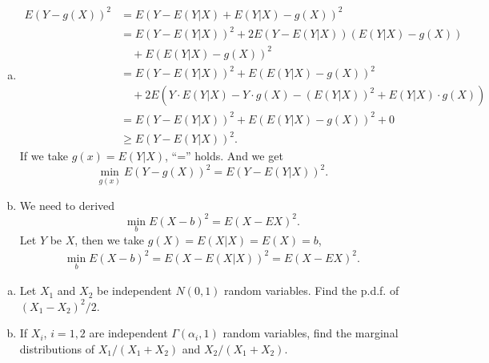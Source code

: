 \documentclass[14pt]{elegantbook}
\begin{document}
    \begin{solution}
        \begin{enumerate}[(a)]
            \item \begin{align*}
                E(Y-g(X))^2&=E(Y-E(Y|X)+E(Y|X)-g(X))^2\\
                &=E(Y-E(Y|X))^2+2E(Y-E(Y|X))(E(Y|X)-g(X))\\
                &\quad+E(E(Y|X)-g(X))^2\\
                &=E(Y-E(Y|X))^2+E(E(Y|X)-g(X))^2\\
                &\quad+2E(Y\cdot E(Y|X)-Y\cdot g(X)-(E(Y|X))^2+E(Y|X)\cdot g(X))\\
                &=E(Y-E(Y|X))^2+E(E(Y|X)-g(X))^2+0\\
                &\geq E(Y-E(Y|X))^2. 
            \end{align*}
            If we take $g(x)=E(Y|X)$, ``='' holds. And we get 
            \[
                \min_{g(x)} E(Y-g(X))^2=E(Y-E(Y|X))^2. 
            \]
            \item We need to derived \[\min_bE(X-b)^2=E(X-EX)^2. \]
            Let $Y$ be $X$, then we take $g(X)=E(X|X)=E(X)=b$, 
            \begin{align*}
                \min_{b}E(X-b)^2=E(X-E(X|X))^2=E(X-EX)^2.
            \end{align*}
        \end{enumerate}
    \end{solution}

    \setcounter{exer}{18}
    \begin{exercise}
        \begin{enumerate}[(a)]
            \item Let $X_1$ and $X_2$ be independent $N(0,1)$ random variables. Find the p.d.f. of $(X_1-X_2)^2/2$. 
            \item If $X_i$, $i=1,2$ are independent $\Gamma(\alpha_i,1)$ random variables, find the marginal distributions of $X_1/(X_1+X_2)$ and $X_2/(X_1+X_2)$. 
        \end{enumerate}
    \end{exercise}
\end{document}
